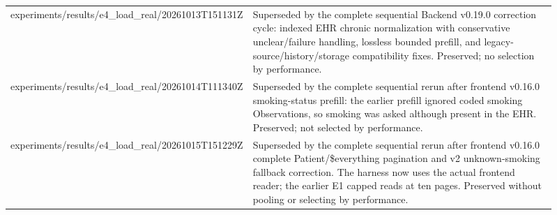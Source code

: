\begin{longtable}{>{\raggedright\arraybackslash}p{0.31\linewidth}>{\raggedright\arraybackslash}p{0.6\linewidth}}
experiments/\allowbreak{}results/\allowbreak{}e4\_\allowbreak{}load\_\allowbreak{}real/\allowbreak{}20261013T151131Z & Superseded by the complete sequential Backend v0.\allowbreak{}19.\allowbreak{}0 correction cycle:\allowbreak{} indexed EHR chronic normalization with conservative unclear/\allowbreak{}failure handling, lossless bounded prefill, and legacy-\allowbreak{}source/\allowbreak{}history/\allowbreak{}storage compatibility fixes.\allowbreak{} Preserved; no selection by performance.\allowbreak{} \\
experiments/\allowbreak{}results/\allowbreak{}e4\_\allowbreak{}load\_\allowbreak{}real/\allowbreak{}20261014T111340Z & Superseded by the complete sequential rerun after frontend v0.\allowbreak{}16.\allowbreak{}0 smoking-\allowbreak{}status prefill:\allowbreak{} the earlier prefill ignored coded smoking Observations, so smoking was asked although present in the EHR.\allowbreak{} Preserved; not selected by performance.\allowbreak{} \\
experiments/\allowbreak{}results/\allowbreak{}e4\_\allowbreak{}load\_\allowbreak{}real/\allowbreak{}20261015T151229Z & Superseded by the complete sequential rerun after frontend v0.\allowbreak{}16.\allowbreak{}0 complete Patient/\allowbreak{}\$everything pagination and v2 unknown-\allowbreak{}smoking fallback correction.\allowbreak{} The harness now uses the actual frontend reader; the earlier E1 capped reads at ten pages.\allowbreak{} Preserved without pooling or selecting by performance.\allowbreak{} \\
\end{longtable}\endgroup
